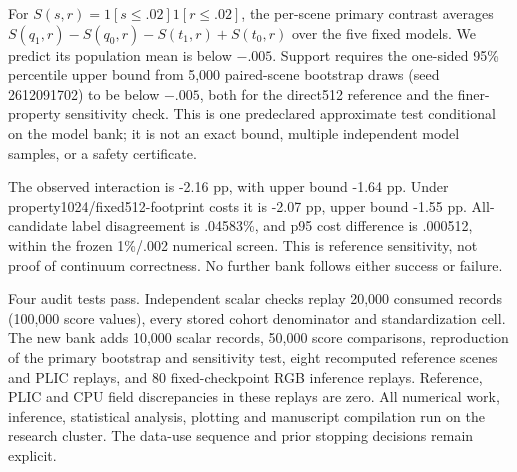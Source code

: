 For $S(s,r)=1[s\le.02]1[r\le.02]$, the per-scene primary contrast averages
$S(q_1,r)-S(q_0,r)-S(t_1,r)+S(t_0,r)$ over the five fixed models. We predict its
population mean is below $-.005$. Support requires the one-sided 95\% percentile
upper bound from 5,000 paired-scene bootstrap draws (seed 2612091702) to be below
$-.005$, both for the direct512 reference and the finer-property sensitivity
check. This is one predeclared approximate test conditional on the model bank;
it is not an exact bound, multiple independent model samples, or a safety certificate.

The observed interaction is -2.16 pp, with upper bound -1.64 pp. Under
property1024/fixed512-footprint costs it is -2.07 pp, upper bound -1.55 pp.
All-candidate label disagreement is .04583\%, and p95 cost difference is .000512,
within the frozen 1\%/.002 numerical screen. This is reference sensitivity, not
proof of continuum correctness. No further bank follows either success or failure.



Four audit tests pass. Independent scalar checks replay 20,000 consumed records
(100,000 score values), every stored cohort denominator and standardization cell.
The new bank adds 10,000 scalar records, 50,000 score comparisons, reproduction
of the primary bootstrap and sensitivity test, eight recomputed reference scenes
and PLIC replays, and 80 fixed-checkpoint RGB inference replays. Reference,
PLIC and CPU field discrepancies in these replays are zero. All numerical work,
inference, statistical analysis, plotting and manuscript compilation run on the
research cluster. The data-use sequence and prior stopping decisions remain explicit.
